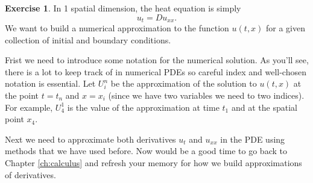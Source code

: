 \documentclass[
]{book}
\theoremstyle{definition}
\theoremstyle{definition}
\theoremstyle{definition}
\newtheorem{exercise}{Exercise}[chapter]
\theoremstyle{remark}
\begin{document}
\begin{exercise}
\protect\hypertarget{exr:unnamed-chunk-545}{}{\label{exr:unnamed-chunk-545} }In 1 spatial dimension, the heat equation is simply \[u_t = D u_{xx}.\] We want to build a numerical approximation to the function \(u(t,x)\) for a given collection of initial and boundary conditions.

Frist we need to introduce some notation for the numerical solution. As you'll see, there is a lot to keep track of in numerical PDEs so careful index and well-chosen notation is essential. Let \(U_i^n\) be the approximation of the solution to \(u(t,x)\) at the point \(t=t_n\) and \(x=x_i\) (since we have two variables we need to two indices). For example, \(U_4^1\) is the value of the approximation at time \(t_1\) and at the spatial point \(x_4\).

Next we need to approximate both derivatives \(u_t\) and \(u_{xx}\) in the PDE using methods that we have used before. Now would be a good time to go back to Chapter \ref{ch:calculus} and refresh your memory for how we build approximations of derivatives.


\end{exercise}
\end{document}
